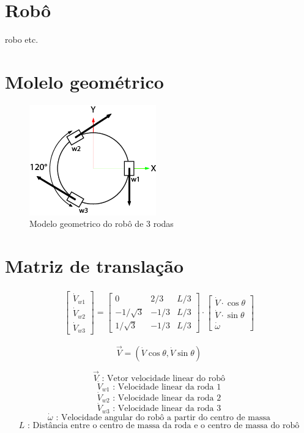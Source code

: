 
\section{Robô}
robo etc.

\section{Molelo geométrico}

\begin{figure}[h]
	\centering
	\includegraphics{figures/model}
	\caption{Modelo geometrico do robô de 3 rodas}
\end{figure}

\section{Matriz de translação}

\begin{gather}
	\begin{bmatrix} \dot{V}_{w1} \\  \dot{V}_{w2} \\  \dot{V}_{w3} \end{bmatrix}
	=
	\begin{bmatrix}
		0 & 2/3 & L/3 \\
		-1/\sqrt{3} & -1/3 & L/3\\
		1/\sqrt{3} & -1/3 & L/3
	\end{bmatrix}
	\cdot
	\begin{bmatrix} \dot{V}\cdot \cos{\theta} \\  \dot{V}\cdot \sin{\theta} \\  \dot{\omega} \end{bmatrix}
\end{gather}

\[ \overrightarrow{V} = (\dot{V}\cos{\theta} , \dot{V}\sin{\theta}) \]



\[\overrightarrow{V} \text{ :  Vetor velocidade linear do robô} \]  
\[\dot{V}_{w1}   \text{ :  Velocidade linear da roda 1} \]  
\[\dot{V}_{w2}   \text{ :  Velocidade linear da roda 2} \]  
\[\dot{V}_{w3}   \text{ :  Velocidade linear da roda 3} \] 
\[\dot{\omega}   \text{ :  Velocidade angular do robô a partir do centro de massa} \]  
\[L   \text{ :  Distância entre o centro de massa da roda e o centro de massa do robô} \]  



